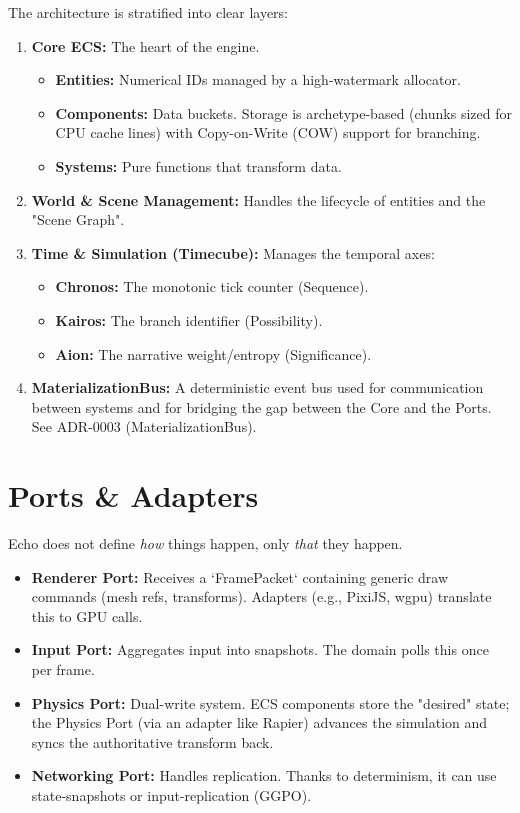 The architecture is stratified into clear layers:

\begin{enumerate}
    \item \textbf{Core ECS:} The heart of the engine.
        \begin{itemize}
            \item \textbf{Entities:} Numerical IDs managed by a high-watermark allocator.
            \item \textbf{Components:} Data buckets. Storage is archetype-based (chunks sized for CPU cache lines) with Copy-on-Write (COW) support for branching.
            \item \textbf{Systems:} Pure functions that transform data.
        \end{itemize}
    \item \textbf{World \& Scene Management:} Handles the lifecycle of entities and the "Scene Graph".
    \item \textbf{Time \& Simulation (Timecube):} Manages the temporal axes:
        \begin{itemize}
            \item \textbf{Chronos:} The monotonic tick counter (Sequence).
            \item \textbf{Kairos:} The branch identifier (Possibility).
            \item \textbf{Aion:} The narrative weight/entropy (Significance).
        \end{itemize}
    \item \textbf{MaterializationBus:} A deterministic event bus used for communication between systems and for bridging the gap between the Core and the Ports. See ADR-0003 (MaterializationBus).
\end{enumerate}

\section{Ports \& Adapters}

Echo does not define \textit{how} things happen, only \textit{that} they happen.

\begin{itemize}
    \item \textbf{Renderer Port:} Receives a `FramePacket` containing generic draw commands (mesh refs, transforms). Adapters (e.g., PixiJS, wgpu) translate this to GPU calls.
    \item \textbf{Input Port:} Aggregates input into snapshots. The domain polls this once per frame.
    \item \textbf{Physics Port:} Dual-write system. ECS components store the "desired" state; the Physics Port (via an adapter like Rapier) advances the simulation and syncs the authoritative transform back.
    \item \textbf{Networking Port:} Handles replication. Thanks to determinism, it can use state-snapshots or input-replication (GGPO).
\end{itemize}

